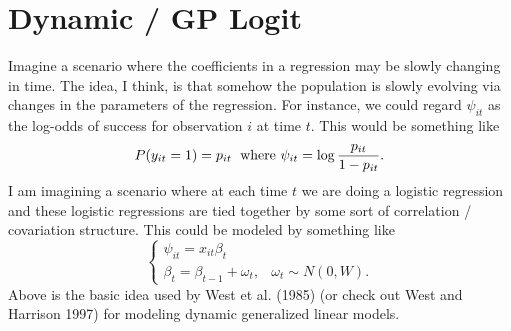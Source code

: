 \documentclass{article}
\begin{document}
\large %
\linespread{1.1} %

\setcounter{section}{0}

\tableofcontents

\newpage

\section{Dynamic / GP Logit}

Imagine a scenario where the coefficients in a regression may be slowly changing
in time.  The idea, I think, is that somehow the population is slowly evolving
via changes in the parameters of the regression.  For instance, we could regard
$\psi_{it}$ as the log-odds of success for observation $i$ at time $t$.  This
would be something like
\[
P(y_{it}=1) = p_{it} \; \textmd{ where } \psi_{it} = \log \frac{p_{it}}{1-p_{it}}.
\]
I am imagining a scenario where at each time $t$ we are doing a logistic
regression and these logistic regressions are tied together by some sort of
correlation / covariation structure.  This could be modeled by something like
\[
\begin{cases}
\psi_{it} = x_{it} \beta_t \\
\beta_t = \beta_{t-1} + \omega_t, & \omega_t \sim N(0, W).
\end{cases}
\]
Above is the basic idea used by West et al. (1985) (or check out West and
Harrison 1997) for modeling dynamic generalized linear models.
\end{document}
